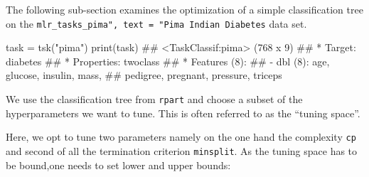 \documentclass[
  11pt,
  parskip=half,
  DIV=calc,
  BCOR=10mm,
  x11names]{scrbook}
\newenvironment{Shaded}{}{}
\newcommand{\KeywordTok}[1]{\textcolor[rgb]{0.00,0.00,1.00}{#1}}
\newcommand{\NormalTok}[1]{#1}
\newcommand{\OperatorTok}[1]{#1}
\newcommand{\StringTok}[1]{\textcolor[rgb]{0.00,0.50,0.50}{#1}}
\begin{document}
The following sub-section examines the optimization of a simple classification tree on the \texttt{mlr\_tasks\_pima",\ text\ =\ "Pima\ Indian\ Diabetes} data set.

\begin{Shaded}
\begin{Highlighting}[]
\NormalTok{task =}\StringTok{ }\KeywordTok{tsk}\NormalTok{(}\StringTok{"pima"}\NormalTok{)}
\KeywordTok{print}\NormalTok{(task)}
\NormalTok{## <TaskClassif:pima> (768 x 9)}
\NormalTok{## * Target: diabetes}
\NormalTok{## * Properties: twoclass}
\NormalTok{## * Features (8):}
\NormalTok{##   - dbl (8): age, glucose, insulin, mass,}
\NormalTok{##     pedigree, pregnant, pressure, triceps}
\end{Highlighting}
\end{Shaded}

We use the classification tree from \texttt{rpart} and choose a subset of the hyperparameters we want to tune.
This is often referred to as the ``tuning space''.

\begin{Shaded}
\end{Shaded}

Here, we opt to tune two parameters namely on the one hand the complexity \texttt{cp} and second of all the termination criterion \texttt{minsplit}.
As the tuning space has to be bound,one needs to set lower and upper bounds:
\end{document}

